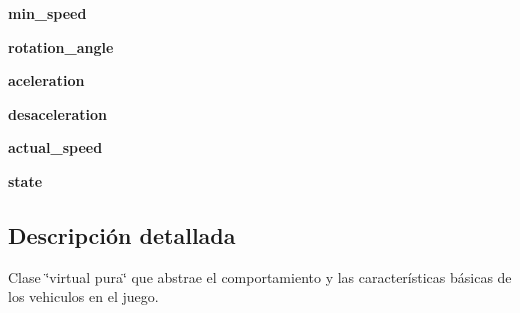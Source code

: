 \begin{DoxyCompactItemize}
\item 
\hypertarget{classengine_1_1basiccar_1_1BasicCar_a79190efb8073fa68788c5e2db735fe47}{
{\bfseries min\-\_\-speed}}
\label{classengine_1_1basiccar_1_1BasicCar_a79190efb8073fa68788c5e2db735fe47}

\item 
\hypertarget{classengine_1_1basiccar_1_1BasicCar_a14deb6db73bbdb7da2cf4afd96e7d1aa}{
{\bfseries rotation\-\_\-angle}}
\label{classengine_1_1basiccar_1_1BasicCar_a14deb6db73bbdb7da2cf4afd96e7d1aa}

\item 
\hypertarget{classengine_1_1basiccar_1_1BasicCar_af16c0b5e77ef7c6e387b8275b89fcae9}{
{\bfseries aceleration}}
\label{classengine_1_1basiccar_1_1BasicCar_af16c0b5e77ef7c6e387b8275b89fcae9}

\item 
\hypertarget{classengine_1_1basiccar_1_1BasicCar_a62a9761bc9d5544c29170d71b43b187d}{
{\bfseries desaceleration}}
\label{classengine_1_1basiccar_1_1BasicCar_a62a9761bc9d5544c29170d71b43b187d}

\item 
\hypertarget{classengine_1_1basiccar_1_1BasicCar_a8a04312a378e0834a7a9190c985c0ef4}{
{\bfseries actual\-\_\-speed}}
\label{classengine_1_1basiccar_1_1BasicCar_a8a04312a378e0834a7a9190c985c0ef4}

\item 
\hypertarget{classengine_1_1basiccar_1_1BasicCar_a4840a0914a623e4cb8c307ac1109bb2a}{
{\bfseries state}}
\label{classengine_1_1basiccar_1_1BasicCar_a4840a0914a623e4cb8c307ac1109bb2a}

\end{DoxyCompactItemize}


\subsection{\-Descripción detallada}
\-Clase \char`\"{}virtual pura\char`\"{} que abstrae el comportamiento y las características básicas de los vehiculos en el juego. 


